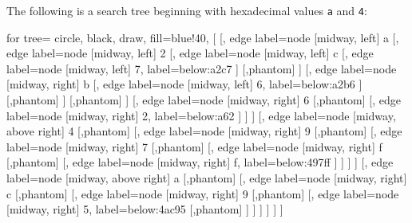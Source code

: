 \documentclass[10pt,a4paper,leqno,bibliography=totoc]{scrartcl}
\newenvironment{alphafootnotes}
{\par\edef\savedfootnotenumber{\number\value{footnote}}
\renewcommand{\thefootnote}{\alph{footnote}}
\setcounter{footnote}{0}}
{\par\setcounter{footnote}{\savedfootnotenumber}}
\begin{document}
\begin{alphafootnotes}
\begin{multicols*}{2}
		The following is a search tree beginning with hexadecimal values \texttt{a} and \texttt{4}: \\
		
		
		\begin{forest}
		for tree={
			circle,
			black,
			draw,
			fill=blue!40,
		}
		[{}
		[{}, edge label={node [midway, left] {a}}
		[{}, edge label={node [midway, left] {2}}
		[{}, edge label={node [midway, left] {c}}
		[{}, edge label={node [midway, left] {7}}, label=below:a2c7
		]
		[,phantom]
		]
		[{}, edge label={node [midway, right] {b}}
		[{}, edge label={node [midway, left] {6}}, label=below:a2b6
		]
		[,phantom]
		]
		[,phantom]
		]
		[{}, edge label={node [midway, right] {6}}
		[,phantom]
		[{}, edge label={node [midway, right] {2}},	label=below:a62
		]
		]
		]
		[{}, edge label={node [midway, above right] {4}}
		[,phantom]
		[{}, edge label={node [midway, right] {9}}
		[,phantom]
		[{}, edge label={node [midway, right] {7}}
		[,phantom]
		[{}, edge label={node [midway, right] {f}}
		[,phantom]
		[{}, edge label={node [midway, right] {f}}, label=below:497ff
		]
		]
		]
		]
		[{}, edge label={node [midway, above right] {a}}
		[,phantom]
		[{}, edge label={node [midway, right] {c}}
		[,phantom]
		[{}, edge label={node [midway, right] {9}}
		[,phantom]
		[{}, edge label={node [midway, right] {5}}, label=below:4ac95
		[,phantom]
		]
		]
		]
		]
		]
		]
		\end{forest}


\end{multicols*}
\end{alphafootnotes}
\end{document}

